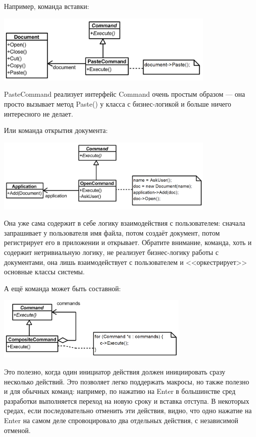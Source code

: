 \documentclass[a5paper]{article}
\begin{document}
Например, команда вставки:

\begin{center}
    \includegraphics[width=0.8\textwidth]{pasteCommand.png}
\end{center}

PasteCommand реализует интерфейс Command очень простым образом --- она просто вызывает метод Paste() у класса с бизнес-логикой и больше ничего интересного не делает.

Или команда открытия документа:

\begin{center}
    \includegraphics[width=0.8\textwidth]{openDocumentCommand.png}
\end{center}

Она уже сама содержит в себе логику взаимодействия с пользователем: сначала запрашивает у пользователя имя файла, потом создаёт документ, потом регистрирует его в приложении и открывает. Обратите внимание, команда, хоть и содержит нетривиальную логику, не реализует бизнес-логику работы с документами, она лишь взаимодействует с пользователем и <<оркестрирует>> основные классы системы.

А ещё команда может быть составной:

\begin{center}
    \includegraphics[width=0.7\textwidth]{compositeCommand.png}
\end{center}

Это полезно, когда один инициатор действия должен инициировать сразу несколько действий. Это позволяет легко поддержать макросы, но также полезно и для обычных команд: например, по нажатию на Enter в большинстве сред разработки выполняется переход на новую сроку и вставка отступа. В некоторых средах, если последовательно отменить эти действия, видно, что одно нажатие на Enter на самом деле спровоцировало два отдельных действия, с независимой отменой.
\end{document}
